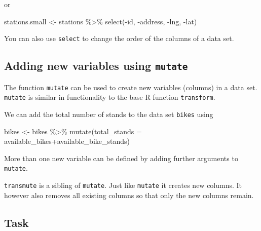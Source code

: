 \documentclass[
]{book}
\newenvironment{Shaded}{\begin{snugshade}}{\end{snugshade}}
\newcommand{\AttributeTok}[1]{\textcolor[rgb]{0.77,0.63,0.00}{#1}}
\newcommand{\FunctionTok}[1]{\textcolor[rgb]{0.00,0.00,0.00}{#1}}
\newcommand{\NormalTok}[1]{#1}
\newcommand{\OtherTok}[1]{\textcolor[rgb]{0.56,0.35,0.01}{#1}}
\newcommand{\SpecialCharTok}[1]{\textcolor[rgb]{0.00,0.00,0.00}{#1}}
\begin{document}
or

\begin{Shaded}
\begin{Highlighting}[]
\NormalTok{stations.small }\OtherTok{\textless{}{-}}\NormalTok{ stations }\SpecialCharTok{\%\textgreater{}\%} \FunctionTok{select}\NormalTok{(}\SpecialCharTok{{-}}\NormalTok{id, }\SpecialCharTok{{-}}\NormalTok{address, }\SpecialCharTok{{-}}\NormalTok{lng, }\SpecialCharTok{{-}}\NormalTok{lat)}
\end{Highlighting}
\end{Shaded}

You can also use \texttt{select} to change the order of the columns of a data set.

\hypertarget{adding-new-variables-using-mutate}{%
\subsection{\texorpdfstring{Adding new variables using \texttt{mutate}}{Adding new variables using mutate}}\label{adding-new-variables-using-mutate}}

The function \texttt{mutate} can be used to create new variables (columns) in a data set. \texttt{mutate} is similar in functionality to the base R function \texttt{transform}.

We can add the total number of stands to the data set \texttt{bikes} using

\begin{Shaded}
\begin{Highlighting}[]
\NormalTok{bikes }\OtherTok{\textless{}{-}}\NormalTok{ bikes }\SpecialCharTok{\%\textgreater{}\%}
           \FunctionTok{mutate}\NormalTok{(}\AttributeTok{total\_stands =}\NormalTok{ available\_bikes}\SpecialCharTok{+}\NormalTok{available\_bike\_stands)}
\end{Highlighting}
\end{Shaded}

More than one new variable can be defined by adding further arguments to \texttt{mutate}.

\texttt{transmute} is a sibling of \texttt{mutate}. Just like \texttt{mutate} it creates new columns. It however also removes all existing columns so that only the new columns remain.

\hypertarget{task-4}{%
\subsection{Task}\label{task-4}}
\end{document}
